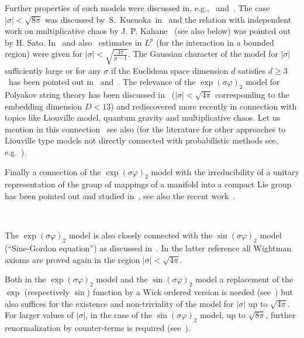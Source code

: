 \documentclass[a4paper,10pt]{article}
\begin{document}
Further properties of such models were discussed in,
e.g.,~{\cite{AHiPRoS2,AHiPRoS1,FroPa,Gie,HiKPS,Simon1974,Zegarli}}
and~{\cite{Albeverio2002,AlHKa,AFeHKL,AlLi,Liang}}. The case $| \sigma | <
\sqrt{8 \pi}$ was discussed by~S.~Kusuoka~in~{\cite{Ku}} and the relation with
independent work on multiplicative chaos by J. P. Kahane~{\cite{Ka}} (see also
below) was pointed out by H. Sato. In~{\cite{AHK2}} and
also~{\cite{Simon1974}} estimates in $L^p$ (for the interaction in a bounded
region) were given for $| \sigma | < \sqrt{\frac{4 \pi}{p - 1}}$. The Gaussian
character of the model for $| \sigma |$ sufficiently large or for any $\sigma$
if the Euclidean space dimension $d$ satisfies $d \geqslant 3$ \ has been
pointed out in~{\cite{AHK2}} and~{\cite{AGaHK}}. The relevance of the $\exp
(\sigma \varphi)_2$ model for Polyakov string theory has been discussed
in~{\cite{AlKrPaSc1986,AlKrPaSc1992,AJPS}} ($| \sigma | < \sqrt{4 \pi}$
corresponding to the embedding dimension $D < 13$) and rediscovered more
recently in connection with topics like Liouville model, quantum gravity and
multiplicative chaos. Let us mention in this
connection~{\cite{AnKa,VaRhShe,RhVa}} see also
{\cite{BeShXi2014,DuSh2019,Gottschalk2013,Sha2016}} (for the literature for
other approaches to Liouville type models not directly connected with
probabilistic methods see, e.g.~{\cite{Bahns2018}}).

Finally a connection of the $\exp (\sigma \varphi)_2$ model with the
irreducibility of a unitary representation of the group of mappings of a
manifold into a compact Lie group has been pointed out and studied
in~{\cite{AHKMT}}, see also the recent work~{\cite{AGoVe}}.

\

The $\exp (\sigma \varphi)_2$ model is also closely connected with the $\sin
(\sigma \varphi)_2$ model (``Sine-Gordon equation'') as discussed
in~{\cite{AHK3,AlHKa,FrSei}}. In the latter reference all Wightman axioms are
proved again in the region $| \sigma | < \sqrt{4 \pi}$.

Both in the $\exp (\sigma \varphi)_2$ model and the $\sin (\sigma \varphi)_2$
model a replacement of the $\exp$ (respectively $\sin$) function by a Wick
ordered version is needed (see~{\cite{AHaRu}}) but also suffices for the
existence and non-triviality of the model for $| \sigma |$ up to $\sqrt{4
\pi}$. For larger values of $| \sigma |$, in the case of the $\sin (\sigma
\varphi)_2$ model, up to $\sqrt{8 \pi}$, further renormalization by
counter-terms is required (see~{\cite{GaNi}}).
\end{document}
